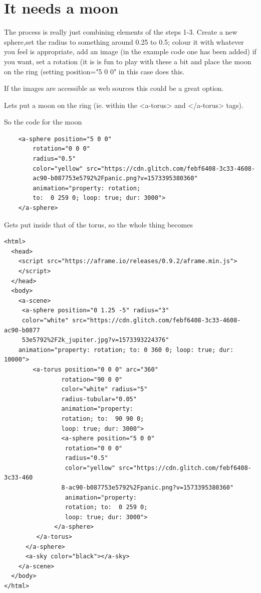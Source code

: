 \section{It needs a moon}
The process is really just combining elements of the steps 1-3. Create a new sphere,set the radius to something around 0.25 to 0.5; colour it with whatever you feel is appropriate, add an image (in the example code one has been added) if you want, set a rotation (it is is fun to play with these a bit and place the moon on the ring (setting position="5 0 0" in this case does this.

If the images are accessible as web sources this could be a great option.

Lets put a moon on the ring (ie. within the <a-torus> and </a-torus> tags).

So the code for the moon
\begin{lstlisting}
    <a-sphere position="5 0 0"
        rotation="0 0 0"
        radius="0.5"
        color="yellow" src="https://cdn.glitch.com/febf6408-3c33-4608-
        ac90-b087753e5792%2Fpanic.png?v=1573395380360"
        animation="property: rotation; 
        to:  0 259 0; loop: true; dur: 3000">
    </a-sphere>
\end{lstlisting}
Gets put inside that of the torus, so the whole thing becomes
\begin{lstlisting}
<html>
  <head>
    <script src="https://aframe.io/releases/0.9.2/aframe.min.js">
    </script>
  </head>
  <body>
    <a-scene>
     <a-sphere position="0 1.25 -5" radius="3" 
     color="white" src="https://cdn.glitch.com/febf6408-3c33-4608-ac90-b0877
     53e5792%2F2k_jupiter.jpg?v=1573393224376"
    animation="property: rotation; to: 0 360 0; loop: true; dur: 10000">
        <a-torus position="0 0 0" arc="360"
                rotation="90 0 0"
                color="white" radius="5"
                radius-tubular="0.05"
                animation="property: 
                rotation; to:  90 90 0; 
                loop: true; dur: 3000">
                <a-sphere position="5 0 0"
                 rotation="0 0 0"
                 radius="0.5"
                 color="yellow" src="https://cdn.glitch.com/febf6408-3c33-460
                8-ac90-b087753e5792%2Fpanic.png?v=1573395380360"
                 animation="property: 
                 rotation; to:  0 259 0; 
                 loop: true; dur: 3000">
              </a-sphere>
         </a-torus>
      </a-sphere>   
      <a-sky color="black"></a-sky>
    </a-scene>
  </body>
</html>               
\end{lstlisting}

